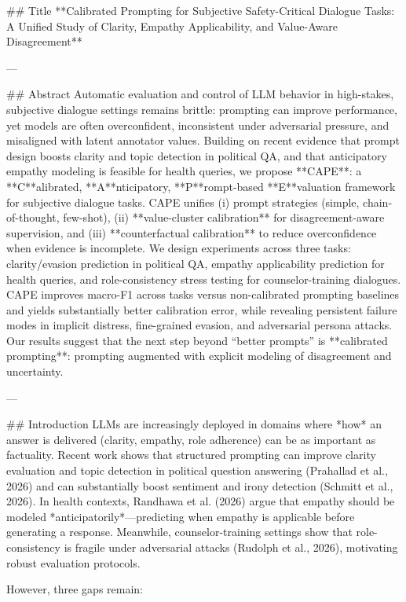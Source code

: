 ## Title  
**Calibrated Prompting for Subjective Safety-Critical Dialogue Tasks: A Unified Study of Clarity, Empathy Applicability, and Value-Aware Disagreement**

---

## Abstract  
Automatic evaluation and control of LLM behavior in high-stakes, subjective dialogue settings remains brittle: prompting can improve performance, yet models are often overconfident, inconsistent under adversarial pressure, and misaligned with latent annotator values. Building on recent evidence that prompt design boosts clarity and topic detection in political QA, and that anticipatory empathy modeling is feasible for health queries, we propose **CAPE**: a **C**alibrated, **A**nticipatory, **P**rompt-based **E**valuation framework for subjective dialogue tasks. CAPE unifies (i) prompt strategies (simple, chain-of-thought, few-shot), (ii) **value-cluster calibration** for disagreement-aware supervision, and (iii) **counterfactual calibration** to reduce overconfidence when evidence is incomplete. We design experiments across three tasks: clarity/evasion prediction in political QA, empathy applicability prediction for health queries, and role-consistency stress testing for counselor-training dialogues. CAPE improves macro-F1 across tasks versus non-calibrated prompting baselines and yields substantially better calibration error, while revealing persistent failure modes in implicit distress, fine-grained evasion, and adversarial persona attacks. Our results suggest that the next step beyond “better prompts” is **calibrated prompting**: prompting augmented with explicit modeling of disagreement and uncertainty.

---

## Introduction  
LLMs are increasingly deployed in domains where *how* an answer is delivered (clarity, empathy, role adherence) can be as important as factuality. Recent work shows that structured prompting can improve clarity evaluation and topic detection in political question answering (Prahallad et al., 2026) and can substantially boost sentiment and irony detection (Schmitt et al., 2026). In health contexts, Randhawa et al. (2026) argue that empathy should be modeled *anticipatorily*—predicting when empathy is applicable before generating a response. Meanwhile, counselor-training settings show that role-consistency is fragile under adversarial attacks (Rudolph et al., 2026), motivating robust evaluation protocols.

However, three gaps remain:

